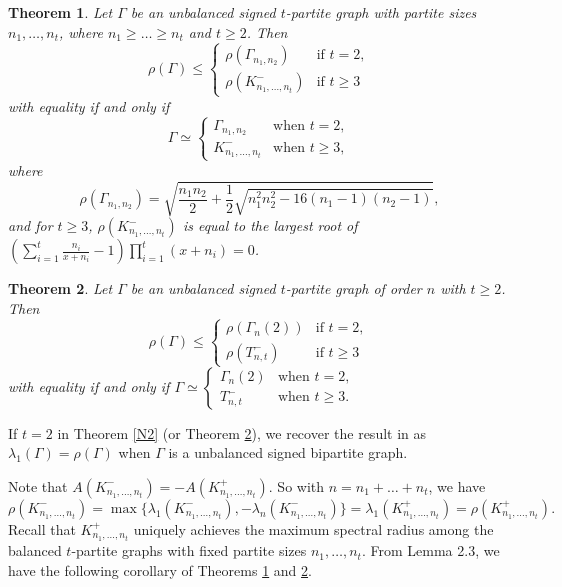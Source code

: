 \documentclass[10pt,a4paper]{amsart}
\numberwithin{equation}{section}
\newtheorem {Theorem} {Theorem}[section]
\begin{document}
%
%




\begin{Theorem}\label{N5}
Let $\Gamma$ be an unbalanced signed $t$-partite graph with partite sizes $n_1, \dots, n_t$, where $n_1\ge \dots\ge n_t$ and $t\ge 2$. Then
\[
\rho(\Gamma)\le 
\begin{cases}
\rho(\Gamma_{n_1,n_2}) & \mbox{if $t=2$}, \\
\rho(K_{n_1, \dots, n_t}^-) & \mbox{if $t\ge 3$}
\end{cases}
	\]
with equality if and only if 
\[
\Gamma\simeq \begin{cases}
\Gamma_{n_1,n_2} &  \mbox{when $t=2$},\\
K_{n_1, \dots, n_t}^{-} &  \mbox{when $t\ge 3$},
\end{cases}
\]
where
\[
\rho(\Gamma_{n_1,n_2})=\sqrt{\frac{n_1n_2}{2}+\frac{1}{2}\sqrt{n_1^2n_2^2-16(n_1-1)(n_2-1)}},
\]
and for $t\ge 3$, 
$\rho(K_{n_1, \dots, n_t}^-)$ is equal to the largest root of $\left(\sum_{i=1}^t\frac{n_i}{x+n_i}-1\right)\prod_{i=1}^t(x+n_i)=0$.
\end{Theorem}










\begin{Theorem}\label{N6}
	Let $\Gamma$ be an unbalanced signed $t$-partite graph of order $n$ with $t\ge 2$. Then
	\[
	\rho(\Gamma)\le \begin{cases} \rho(\Gamma_n(2)) & \mbox{if $t=2$},\\
\rho (T_{n, t}^-) & \mbox{if $t\ge 3$}
\end{cases}
	\]
	with equality if and only if $\Gamma\simeq \begin{cases} 
\Gamma_n(2) & \mbox{when $t=2$},\\ 
T_{n, t}^- &  \mbox{when $t\ge 3$}.
\end{cases}$
\end{Theorem}


If $t=2$ in Theorem \ref{N2} (or Theorem \ref{N6}), we recover the result in \cite{CDG} as  $\lambda_1(\Gamma)=\rho(\Gamma)$ when $\Gamma$ is a unbalanced signed bipartite graph. 

Note that  $A(K_{n_1, \dots, n_t}^-)=-A(K_{n_1, \dots, n_t}^+)$. So with $n=n_1+\dots+n_t$, we have 
\[
\rho (K_{n_1, \dots, n_t}^-) =\max\{\lambda_1(K_{n_1, \dots, n_t}^-), -\lambda_n(K_{n_1, \dots, n_t}^-)\}=\lambda_1(K_{n_1, \dots, n_t}^+)
=\rho(K_{n_1, \dots, n_t}^+).
\] 
Recall that  $K_{n_1, \dots, n_t}^+$ uniquely achieves the maximum spectral radius among the balanced $t$-partite graphs with fixed partite sizes $n_1,\dots, n_t$.  From Lemma 2.3,  we have the following corollary of Theorems \ref{N5} and \ref{N6}.
\end{document}
